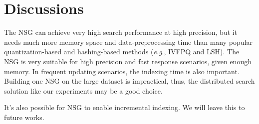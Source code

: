 \documentclass{vldb}
\def\eg {\emph{e.g}.} \def\Eg{\emph{E.g}.}
\begin{document}


\section{Discussions}
The NSG can achieve very high search performance at high precision, but it needs much more memory space and data-preprocessing time than many popular quantization-based and hashing-based methods (\eg, IVFPQ and LSH). The NSG is very suitable for high precision and fast response scenarios, given enough memory. In frequent updating scenarios, the indexing time is also important. Building one NSG on the large dataset is impractical, thus, the distributed search solution like our experiments may be a good choice. 

It's also possible for NSG to enable incremental indexing. We will leave this to future works. 
\end{document}
